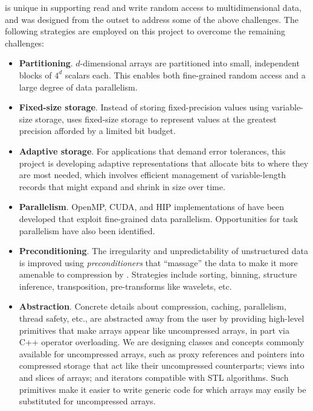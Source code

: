 {\zfp} is unique in supporting read and write random access to
multidimensional data, and was designed from the outset to address
some of the above challenges.  The following strategies are employed on
this project to overcome the remaining challenges:
%
\begin{itemize}
\item \textbf{Partitioning}.  $d$-dimensional arrays are partitioned
into small, independent blocks of $4^d$ scalars each.  This enables both
fine-grained random access and a large degree of data parallelism.

\item \textbf{Fixed-size storage}.  Instead of storing fixed-precision
values using variable-size storage, {\zfp} uses fixed-size storage to
represent values at the greatest precision afforded by a limited
bit budget.

\item \textbf{Adaptive storage}.  For applications that demand error
tolerances, this project is developing adaptive representations that
allocate bits to where they are most needed, which involves efficient
management of variable-length records that might expand and shrink in
size over time.

\item \textbf{Parallelism}.  OpenMP, CUDA, and HIP implementations of {\zfp}
have been developed that exploit fine-grained data parallelism.
Opportunities for task parallelism have also been identified.

\item \textbf{Preconditioning}.  The irregularity and unpredictability
of unstructured data is improved using \emph{preconditioners} that
``massage'' the data to make it more amenable to compression by {\zfp}.
Strategies include sorting, binning, structure inference, transposition,
pre-transforms like wavelets, etc.

\item \textbf{Abstraction}.  Concrete details about compression, caching,
parallelism, thread safety, etc., are abstracted away from the user by
providing high-level primitives that make {\zfp} arrays appear like
uncompressed arrays, in part via C++ operator overloading.  We are
designing classes and concepts commonly available for uncompressed arrays,
such as proxy references and pointers into compressed storage that act
like their uncompressed counterparts; views into and slices of arrays;
and iterators compatible with STL algorithms.  Such primitives make it
easier to write generic code for which {\zfp} arrays may easily be
substituted for uncompressed arrays.
\end{itemize}

